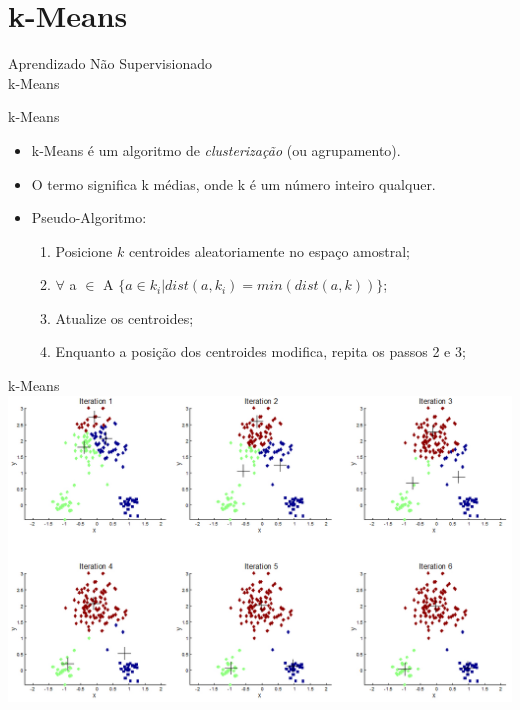 \documentclass{libs/ufc_format}
\begin{document}
\section{k-Means}

\begin{frame}{}
    \centering
    \LARGE
    Aprendizado Não Supervisionado\\
    \vspace{0.5cm}
    \LARGE
    k-Means
\end{frame}

\begin{frame}{k-Means}
    \begin{itemize}
        \justifying
        \item k-Means é um algoritmo de \textit{clusterização} (ou agrupamento).
        \item O termo significa k médias, onde k é um número inteiro qualquer.
        \item<2-> Pseudo-Algoritmo:
            \begin{enumerate}
                \item<3-> Posicione $k$ centroides aleatoriamente no espaço amostral;
                \item<4-> $\forall$ a $\in$ A $\{a \in k_{i}| dist(a,k_{i}) = min(dist(a, k))\}$;
                \item<5-> Atualize os centroides;
                \item<6> Enquanto a posição dos centroides modifica, repita os passos 2 e 3;
            \end{enumerate}
    \end{itemize}
\end{frame}

\begin{frame}{k-Means}
    \centering
    \includegraphics[width=\textwidth]{media/kmeansclustering}
\end{frame}
\end{document}
